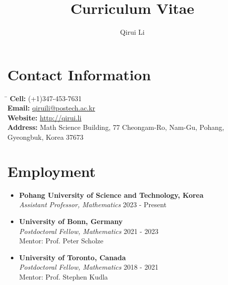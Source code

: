 \documentclass[a4paper,10pt]{article}
\begin{document}
\title{Curriculum Vitae}
\author{Qirui Li}
\date{}
\maketitle

\section*{Contact Information}
\begin{tabbing}
\hspace{1in} \= \hspace{2in} \kill
\textbf{Cell:} \> (+1)347-453-7631\\
\textbf{Email:} \> \href{mailto:qiruili@postech.ac.kr}{qiruili@postech.ac.kr} \\
\textbf{Website:} \> \href{http://qirui.li}{http://qirui.li} \\
\textbf{Address:} \> Math Science Building, 77 Cheongam-Ro, Nam-Gu, Pohang, Gyeongbuk, Korea 37673 \\
\end{tabbing}

\section*{Employment}
\begin{itemize}
    \item \textbf{Pohang University of Science and Technology, Korea} \\
    \textit{Assistant Professor, Mathematics} \hfill 2023 - Present
    \item \textbf{University of Bonn, Germany} \\
    \textit{Postdoctoral Fellow, Mathematics} \hfill 2021 - 2023 \\
    Mentor: Prof. Peter Scholze
    \item \textbf{University of Toronto, Canada} \\
    \textit{Postdoctoral Fellow, Mathematics} \hfill 2018 - 2021 \\
    Mentor: Prof. Stephen Kudla
\end{itemize}
\end{document}
